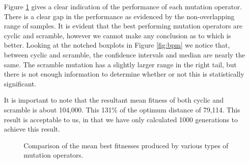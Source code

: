 \documentclass[12pt,twocolumn,oneside]{osajnl}
\begin{document}
Figure \ref{fig:mg} gives a clear indication of the performance of each mutation operator. There is a clear gap in the performance as evidenced by the non-overlapping range of samples. It is evident that the best performing mutation operators are cyclic and scramble, however we cannot make any conclusion as to which is better. Looking at the notched boxplots in Figure \ref{fig:bpm} we notice that, between cyclic and scramble, the confidence intervals and median are nearly the same. The scramble mutation has a slightly larger range in the right tail, but there is not enough information to determine whether or not this is statistically significant.

It is important to note that the resultant mean fitness of both cyclic and scramble is about 104,000. This 131\% of the optimum distance of 79,114. This result is acceptable to us, in that we have only calculated 1000 generations to achieve this result.

\begin{figure}[htbp]
\centering
{}
\caption{Comparison of the mean best fitnesses produced by various types of mutation operators.}
\label{fig:mg}
\end{figure}
\end{document}

